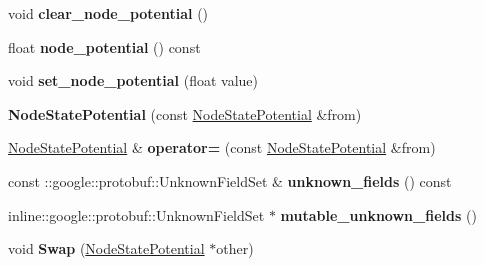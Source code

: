 \begin{DoxyCompactItemize}
\item 
\hypertarget{classgraph_1_1NodeStatePotential_aac3b8f48c1b6320a6381a16d8743073e}{
void {\bfseries clear\_\-node\_\-potential} ()}
\label{classgraph_1_1NodeStatePotential_aac3b8f48c1b6320a6381a16d8743073e}

\item 
\hypertarget{classgraph_1_1NodeStatePotential_a69e4cc64ea70c2153167a1c0f738bfbd}{
float {\bfseries node\_\-potential} () const }
\label{classgraph_1_1NodeStatePotential_a69e4cc64ea70c2153167a1c0f738bfbd}

\item 
\hypertarget{classgraph_1_1NodeStatePotential_a68c6f680cb958390f116dcabb4c0a007}{
void {\bfseries set\_\-node\_\-potential} (float value)}
\label{classgraph_1_1NodeStatePotential_a68c6f680cb958390f116dcabb4c0a007}

\item 
\hypertarget{classgraph_1_1NodeStatePotential_abe93f0f8c63b6b1861903c72d29bf718}{
{\bfseries NodeStatePotential} (const \hyperlink{classgraph_1_1NodeStatePotential}{NodeStatePotential} \&from)}
\label{classgraph_1_1NodeStatePotential_abe93f0f8c63b6b1861903c72d29bf718}

\item 
\hypertarget{classgraph_1_1NodeStatePotential_a004077f286e88ffafc8b40300d44e201}{
\hyperlink{classgraph_1_1NodeStatePotential}{NodeStatePotential} \& {\bfseries operator=} (const \hyperlink{classgraph_1_1NodeStatePotential}{NodeStatePotential} \&from)}
\label{classgraph_1_1NodeStatePotential_a004077f286e88ffafc8b40300d44e201}

\item 
\hypertarget{classgraph_1_1NodeStatePotential_add63ea9eec1f3caff6ee19c4525e5972}{
const ::google::protobuf::UnknownFieldSet \& {\bfseries unknown\_\-fields} () const }
\label{classgraph_1_1NodeStatePotential_add63ea9eec1f3caff6ee19c4525e5972}

\item 
\hypertarget{classgraph_1_1NodeStatePotential_abb591e0b424e774040f8109c92413f0d}{
inline::google::protobuf::UnknownFieldSet $\ast$ {\bfseries mutable\_\-unknown\_\-fields} ()}
\label{classgraph_1_1NodeStatePotential_abb591e0b424e774040f8109c92413f0d}

\item 
\hypertarget{classgraph_1_1NodeStatePotential_a13b774b1f32294830d162db5e80eb3b7}{
void {\bfseries Swap} (\hyperlink{classgraph_1_1NodeStatePotential}{NodeStatePotential} $\ast$other)}
\label{classgraph_1_1NodeStatePotential_a13b774b1f32294830d162db5e80eb3b7}


\end{DoxyCompactItemize}
